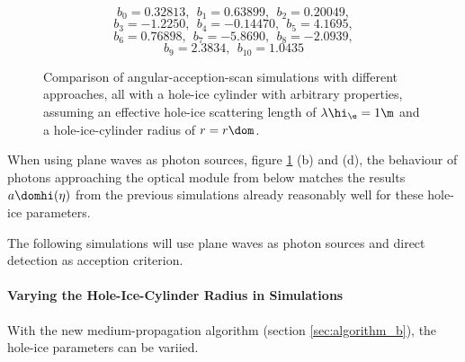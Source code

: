 $$ b_0 = 0.32813, \ \ b_1 = 0.63899, \ \ b_2 = 0.20049, $$
$$ b_3 = -1.2250, \ \ b_4 = -0.14470, \ \ b_5 = 4.1695, $$
$$ b_6 = 0.76898, \ \ b_7 = -5.8690, \ \ b_8 = -2.0939, $$
$$ b_9 = 2.3834, \ \ b_{10} = 1.0435 $$

\begin{figure}[htbp]
  \hfill
  \hfill
  \hfill
  \hfill
  \caption{Comparison of angular-acception-scan simulations with different approaches, all with a hole-ice cylinder with arbitrary properties, assuming an effective hole-ice scattering length of $\lambda\hi_\e=1\m$ and a hole-ice-cylinder radius of $r=r\dom$.}
  \label{fig:eVapie9t}
\end{figure}

When using plane waves as photon sources, figure \ref{fig:eVapie9t} (b) and (d), the behaviour of photons approaching the optical module from below matches the results $a\domhi(\eta)$ from the previous simulations \cite{icepaper} already reasonably well for these hole-ice parameters.

The following simulations will use plane waves as photon sources and direct detection as acception criterion.



\paragraph{Varying the Hole-Ice-Cylinder Radius in Simulations}
With the new medium-propagation algorithm (section \ref{sec:algorithm_b}), the hole-ice parameters can be variied.


